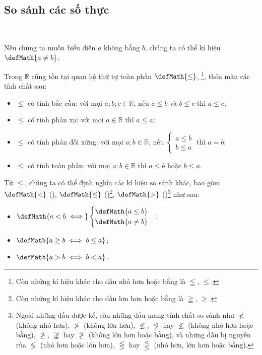 \subsection{So sánh các số thực}

\ %

Nếu chúng ta muốn biểu diễn $a$ không bằng $b$, chúng ta có thể kí hiệu $\defMath{a \neq b}$.

Trong $\mathbb{R}$ cũng tồn tại quan hệ thứ tự toàn phần $\defMath{\leq}$, \footnote{Còn những kí hiệu khác cho dấu nhỏ hơn hoặc bằng là $\leqq$, $\leqslant$.}, thỏa mãn các tính chất sau:
\begin{itemize}
   \item $\leq$ có tính bắc cầu: với mọi $a; b; c \in \mathbb{R}$, nếu $a \leq b$ và $b \leq c$ thì $a \leq c$;
   \item $\leq$ có tính phản xạ: với mọi $a \in \mathbb{R}$ thì $a \leq a$;
   \item $\le $ có tính phản đối xứng: với mọi $a; b \in \mathbb{R}$, nếu $\begin{cases}
      a \leq b\\
      b \leq a
   \end{cases}$ thì $a = b$;
   \item $\leq$ có tính toàn phần: với mọi $a; b \in \mathbb{R}$ thì $a \leq b$ hoặc $b \leq a$.
\end{itemize}

Từ $\le$, chúng ta có thể định nghĩa các kí hiệu so sánh khác, bao gồm $\defMath{<}$ (), $\defMath{\leq}$ ()\footnote{Còn những kí hiệu khác cho dấu lơn hơn hoặc bằng là $\geqq$, $\geqslant$.}, $\defMath{>}$ ()\footnote{Ngoài những dấu được kể, còn những dấu mang tính chất so sánh như $\nless$ (không nhỏ hơn), $\ngtr$ (không lớn hơn), $\nleq$, $\not \leqq$ hay $\nleqslant$ (không nhỏ hơn hoặc bằng), $\ngeq$, $\not \geqq$ hay $\ngeqslant$ (không lớn hơn hoặc bằng), và những dấu bị nguyền rủa $\lessgtr$ (nhỏ hơn hoặc lớn hơn), $\lesseqgtr$ hay $\lesseqqgtr$ (nhỏ hơn, lớn hơn hoặc bằng).} như sau:
\begin{itemize}
   \item $\defMath{a < b \iff} \begin{cases}
      \defMath{a \leq b}\\
      \defMath{a \neq b}
   \end{cases}$;
   \item $\defMath{a \geq b \iff b \leq a}$;
   \item $\defMath{a > b \iff b < a}$.
\end{itemize}


